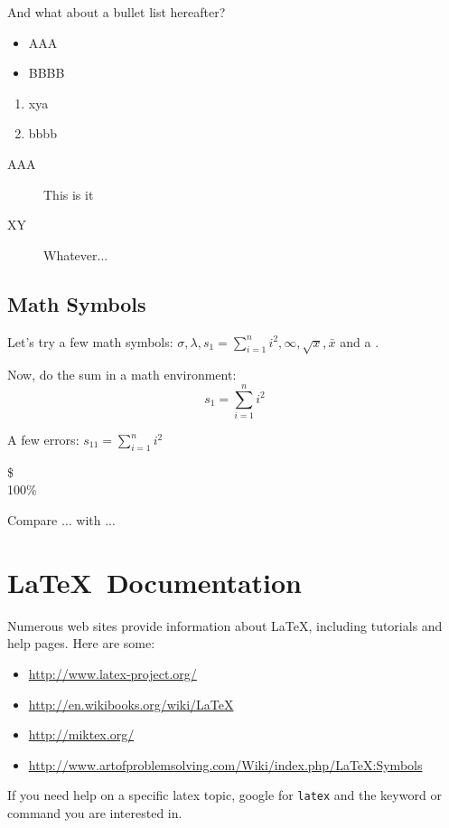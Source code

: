 \documentclass[12pt]{article}
\begin{document}
And what about a bullet list hereafter?


\begin{itemize}
  \item AAA
  \item BBBB
\end{itemize}


\begin{enumerate}
  \item xya
  \item bbbb
\end{enumerate}

\begin{description}
  \item[AAA] This is it
  \item[XY] Whatever...
\end{description}




\subsection{Math Symbols}

Let's try a few math symbols: $\sigma, \lambda,
s_1 = \sum_{i=1}^n i^2, \infty, \sqrt{x}, \bar{x}$ and a \smiley.


Now, do the sum in a math environment:
\[
s_1 = \sum_{i=1}^n i^2
\]

A few errors: $s_{11} = \sum_{i=1}^n i^2$

\$ \\

100\%

Compare $\ldots$ with ...

\section{\LaTeX\ Documentation}

Numerous web sites provide information about \LaTeX,
including tutorials and help pages. Here are some:

\begin{itemize}
\item \url{http://www.latex-project.org/}
\item \url{http://en.wikibooks.org/wiki/LaTeX}
\item \url{http://miktex.org/}
\item \url{http://www.artofproblemsolving.com/Wiki/index.php/LaTeX:Symbols}
\end{itemize}

If you need help on a specific latex topic, google for
\verb|latex| and the keyword or command you are interested in.
\end{document}
